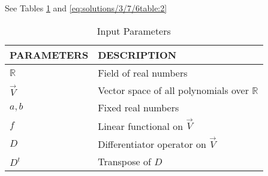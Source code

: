 See Tables \ref{eq:solutions/3/7/6table:1}  and \ref{eq:solutions/3/7/6table:2}



\begin{table}[!h]
\centering
\begin{tabular}{|p{3cm}|p{5cm}|}
\hline
\textbf{PARAMETERS}&\textbf{DESCRIPTION}\\
\hline
$\mathbb{R}$&Field of real numbers\\
\hline
$\vec{V}$&Vector space of all polynomials over $\mathbb{R}$\\
\hline
$a,b$ & Fixed real numbers\\
\hline
$f$ &Linear functional on $\vec{V}$\\
\hline
$D$ & Differentiator operator on $\vec{V}$\\
\hline
$D^t$ &Transpose of $D$\\
\hline
\end{tabular}
\caption{Input Parameters}
\label{eq:solutions/3/7/6table:1}
\end{table}



